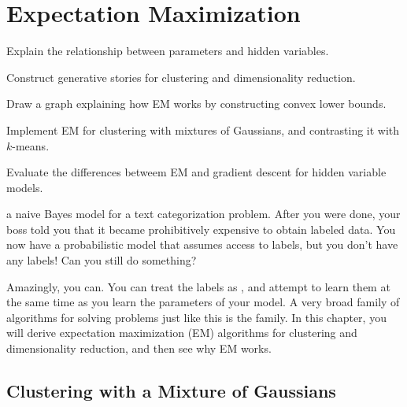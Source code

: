 
\chapter{Expectation Maximization} \label{sec:em}

\chapterquote{}{}

\begin{learningobjectives}
\item Explain the relationship between parameters and hidden
  variables.
\item Construct generative stories for clustering and dimensionality
  reduction.
\item Draw a graph explaining how EM works by constructing convex
  lower bounds.
\item Implement EM for clustering with mixtures of Gaussians, and
  contrasting it with $k$-means.
\item Evaluate the differences betweem EM and gradient descent for
  hidden variable models.
\end{learningobjectives}

\dependencies{}

 a naive Bayes model for a text
categorization problem.  After you were done, your boss told you that
it became prohibitively expensive to obtain labeled data.  You now
have a probabilistic model that assumes access to labels, but you
don't have any labels!  Can you still do something?

Amazingly, you can.  You can treat the labels as , and attempt to learn them at the same time as you learn
the parameters of your model.  A very broad family of algorithms for
solving problems just like this is the  family.  In this chapter, you will derive expectation
maximization (EM) algorithms for clustering and dimensionality reduction,
and then see why EM works.

\section{Clustering with a Mixture of Gaussians}

